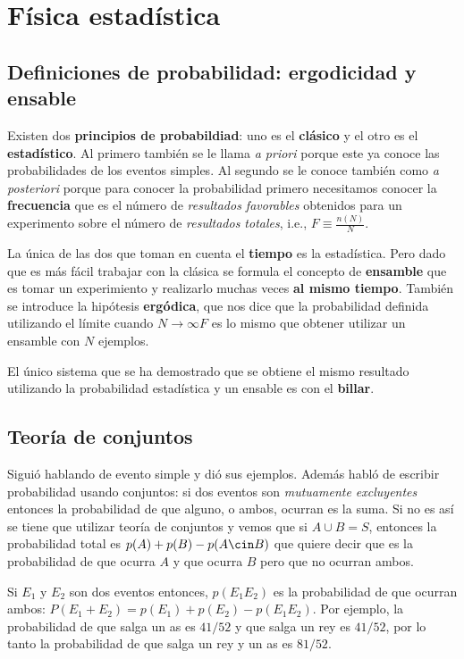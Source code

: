 \section{Física estadística}

\subsection{Definiciones de probabilidad: ergodicidad y
ensable}
Existen dos \textbf{principios de probabildiad}: uno es el
\textbf{clásico} y el otro es el \textbf{estadístico}. Al
primero también se le llama \emph{a priori} porque este ya
conoce las probabilidades de los eventos simples. Al segundo
se le conoce también como \emph{a posteriori} porque para
conocer la probabilidad primero necesitamos conocer la
\textbf{frecuencia} que es el número de \emph{resultados
favorables} obtenidos para un experimento sobre el número de
\emph{resultados totales}, i.e., $F \equiv \displaystyle
\frac{n(N)}{N}$.

La única de las dos que toman en cuenta el \textbf{tiempo} es la
estadística. Pero dado que es más fácil trabajar con la
clásica se formula el concepto de \textbf{ensamble} que es
tomar un experimiento y realizarlo muchas veces \textbf{al
mismo tiempo}. También se introduce la hipótesis
\textbf{ergódica}, que nos dice que la probabilidad definida
utilizando el límite cuando $N\to\infty F$ es lo mismo que
obtener utilizar un ensamble con $N$ ejemplos.

El único sistema que se ha demostrado que se obtiene el
mismo resultado utilizando la probabilidad estadística y un
ensable es con el \textbf{billar}.

\subsection{Teoría de conjuntos}
Siguió hablando de evento simple y dió sus ejemplos.
Además habló de escribir probabilidad usando conjuntos: si
dos eventos son \emph{mutuamente excluyentes} entonces la
probabilidad de que alguno, o ambos, ocurran es la suma. Si
no es así se tiene que utilizar teoría de conjuntos y vemos
que si $A \cup B = S$, entonces la probabilidad total es
$p(A) + p(B) - p(A\cin B)$ que quiere decir que es la
probabilidad de que ocurra $A$  y que ocurra $B$ pero que no
ocurran ambos.

Si $E_1$ y $E_2$ son dos eventos entonces, $p(E_1 E_2)$ es
la probabilidad de que ocurran ambos: $P(E_1 + E_2) = p(E_1)
+ p(E_2) - p(E_1 E_2)$. Por ejemplo, la probabilidad de que
salga un as es $4 1/52$ y que salga un rey es $4 1/52$, por
lo tanto la probabilidad de que salga un rey y un as es $8
1/52$.


